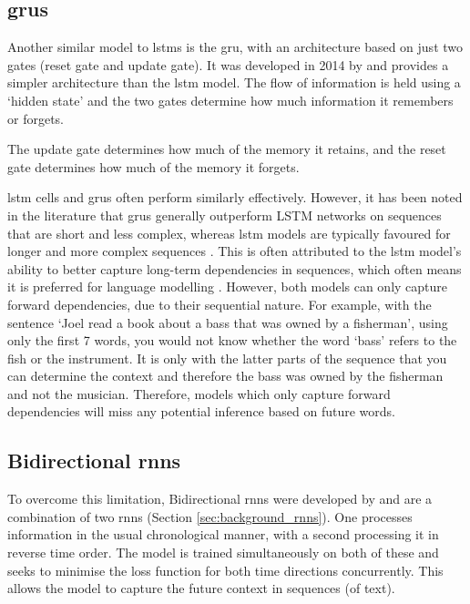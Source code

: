 \subsection{\acrlong{gru}s}
\label{sec:background_grus}
Another similar model to \acrshort{lstm}s is the \acrfull {gru}, with an architecture based on just two gates (reset gate and update gate). It was developed in 2014 by \citet{cho2014learning} and provides a simpler architecture than the \acrshort{lstm} model. The flow of information is held using a `hidden state' and the two gates determine how much information it remembers or forgets.

The update gate determines how much of the memory it retains, and the reset gate determines how much of the memory it forgets.

\acrlong{lstm} cells and \acrlong{gru}s often perform similarly effectively. However, it has been noted in the literature that \acrshort{gru}s generally outperform LSTM networks on sequences that are short and less complex, whereas \acrshort{lstm} models are typically favoured for longer and more complex sequences \citep{cahuantzi2023comparison}. This is often attributed to the \acrshort{lstm} model's ability to better capture long-term dependencies in sequences, which often means it is preferred for language modelling \citep{Irie2016}. However, both models can only capture forward dependencies, due to their sequential nature. For example, with the sentence `Joel read a book about a bass that was owned by a fisherman', using only the first 7 words, you would not know whether the word `bass' refers to the fish or the instrument. It is only with the latter parts of the sequence that you can determine the context and therefore the bass was owned by the fisherman and not the musician. Therefore, models which only capture forward dependencies will miss any potential inference based on future words. 

\subsection{Bidirectional \acrlong{rnn}s}
\label{sec:background_bidirectional_rnns}
To overcome this limitation, Bidirectional \acrshort{rnn}s were developed by \citet{Schuster} and are a combination of two \acrshort{rnn}s (Section \ref{sec:background_rnns}). One processes information in the usual chronological manner, with a second processing it in reverse time order. The model is trained simultaneously on both of these and seeks to minimise the loss function for both time directions concurrently. This allows the model to capture the future context in sequences (of text).

